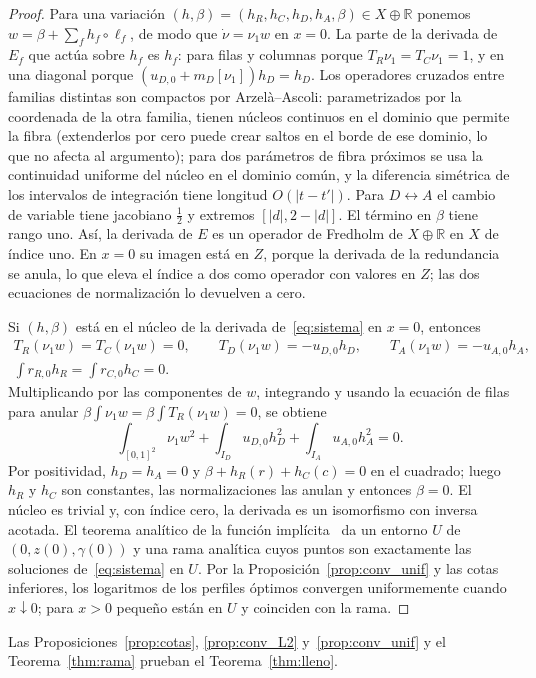 \begin{proof}
Para una variación $(h,\beta)=(h_R,h_C,h_D,h_A,\beta)\in X\oplus\mathbb R$ ponemos
$w=\beta+\sum_fh_f\circ\ell_f$, de modo que $\dot\nu=\nu_1w$ en $x=0$. La parte de la derivada de
$E_f$ que actúa sobre $h_f$ es $h_f$: para filas y columnas porque $T_R\nu_1=T_C\nu_1=1$, y en una
diagonal porque $(u_{D,0}+m_D[\nu_1])h_D=h_D$. Los operadores cruzados entre familias distintas son
compactos por Arzelà--Ascoli: parametrizados por la coordenada de la otra familia, tienen núcleos
continuos en el dominio que permite la fibra (extenderlos por cero puede crear saltos en el borde de
ese dominio, lo que no afecta al argumento); para dos parámetros de fibra próximos se usa la
continuidad uniforme del núcleo en el dominio común, y la diferencia simétrica de los intervalos de
integración tiene longitud $O(|t-t'|)$. Para $D\leftrightarrow A$ el cambio de variable tiene
jacobiano $\frac12$ y extremos $[|d|,2-|d|]$. El término en $\beta$ tiene rango uno. Así, la derivada
de $E$ es un operador de Fredholm de $X\oplus\mathbb R$ en $X$ de índice uno. En $x=0$ su imagen está
en $Z$, porque la derivada de la redundancia se anula, lo que eleva el índice a dos como operador con
valores en $Z$; las dos ecuaciones de normalización lo devuelven a cero.

Si $(h,\beta)$ está en el núcleo de la derivada de~\eqref{eq:sistema} en $x=0$, entonces
\begin{gather*}
 T_R(\nu_1w)=T_C(\nu_1w)=0,\qquad T_D(\nu_1w)=-u_{D,0}h_D,\qquad T_A(\nu_1w)=-u_{A,0}h_A,\\
 \int r_{R,0}h_R=\int r_{C,0}h_C=0 .
\end{gather*}
Multiplicando por las componentes de $w$, integrando y usando la ecuación de filas para anular
$\beta\int\nu_1w=\beta\int T_R(\nu_1w)=0$, se obtiene
\begin{equation}\label{eq:energia}
 \int_{[0,1]^2}\nu_1w^2+\int_{I_D}u_{D,0}h_D^2+\int_{I_A}u_{A,0}h_A^2=0 .
\end{equation}
Por positividad, $h_D=h_A=0$ y $\beta+h_R(r)+h_C(c)=0$ en el cuadrado; luego $h_R$ y $h_C$ son
constantes, las normalizaciones las anulan y entonces $\beta=0$. El núcleo es trivial y, con índice
cero, la derivada es un isomorfismo con inversa acotada. El teorema analítico de la función
implícita~\cite{Zeidler} da un entorno $U$ de $(0,z(0),\gamma(0))$ y una rama analítica cuyos puntos
son exactamente las soluciones de~\eqref{eq:sistema} en $U$. Por la Proposición~\ref{prop:conv_unif} y las
cotas inferiores, los logaritmos de los perfiles óptimos convergen uniformemente cuando $x\downarrow0$;
para $x>0$ pequeño están en $U$ y coinciden con la rama.
\end{proof}

Las Proposiciones~\ref{prop:cotas}, \ref{prop:conv_L2} y~\ref{prop:conv_unif} y el
Teorema~\ref{thm:rama} prueban el Teorema~\ref{thm:lleno}.
